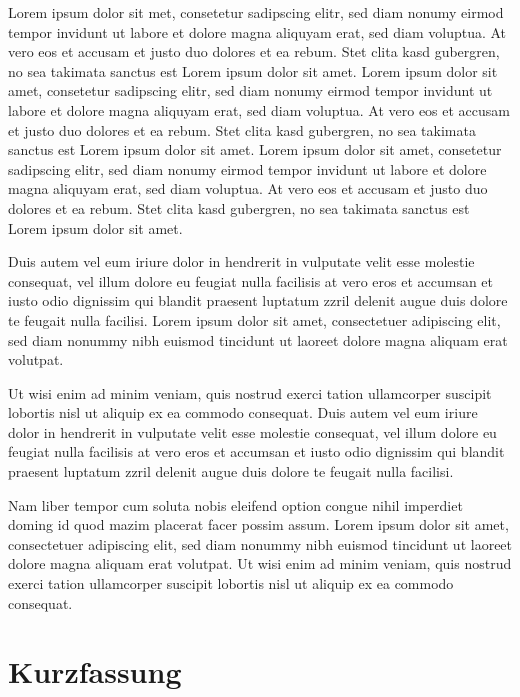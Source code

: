 \documentclass[a4paper, fleqn, headsepline, footsepline, 12pt, parskip=half]{scrartcl}
\begin{document}
Lorem ipsum dolor sit met, consetetur sadipscing elitr, sed diam nonumy eirmod tempor invidunt ut labore et dolore magna aliquyam erat, sed diam voluptua. At vero eos et accusam et justo duo dolores et ea rebum. Stet clita kasd gubergren, no sea takimata sanctus est Lorem ipsum dolor sit amet. Lorem ipsum dolor sit amet, consetetur sadipscing elitr, sed diam nonumy eirmod tempor invidunt ut labore et dolore magna aliquyam erat, sed diam voluptua. At vero eos et accusam et justo duo dolores et ea rebum. Stet clita kasd gubergren, no sea takimata sanctus est Lorem ipsum dolor sit amet. Lorem ipsum dolor sit amet, consetetur sadipscing elitr, sed diam nonumy eirmod tempor invidunt ut labore et dolore magna aliquyam erat, sed diam voluptua. At vero eos et accusam et justo duo dolores et ea rebum. Stet clita kasd gubergren, no sea takimata sanctus est Lorem ipsum dolor sit amet.

Duis autem vel eum iriure dolor in hendrerit in vulputate velit esse molestie consequat, vel illum dolore eu feugiat nulla facilisis at vero eros et accumsan et iusto odio dignissim qui blandit praesent luptatum zzril delenit augue duis dolore te feugait nulla facilisi. Lorem ipsum dolor sit amet, consectetuer adipiscing elit, sed diam nonummy nibh euismod tincidunt ut laoreet dolore magna aliquam erat volutpat.

Ut wisi enim ad minim veniam, quis nostrud exerci tation ullamcorper suscipit lobortis nisl ut aliquip ex ea commodo consequat. Duis autem vel eum iriure dolor in hendrerit in vulputate velit esse molestie consequat, vel illum dolore eu feugiat nulla facilisis at vero eros et accumsan et iusto odio dignissim qui blandit praesent luptatum zzril delenit augue duis dolore te feugait nulla facilisi.

Nam liber tempor cum soluta nobis eleifend option congue nihil imperdiet doming id quod mazim placerat facer possim assum. Lorem ipsum dolor sit amet, consectetuer adipiscing elit, sed diam nonummy nibh euismod tincidunt ut laoreet dolore magna aliquam erat volutpat. Ut wisi enim ad minim veniam, quis nostrud exerci tation ullamcorper suscipit lobortis nisl ut aliquip ex ea commodo consequat. 
\newpage

\section*{Kurzfassung} %
\end{document}
